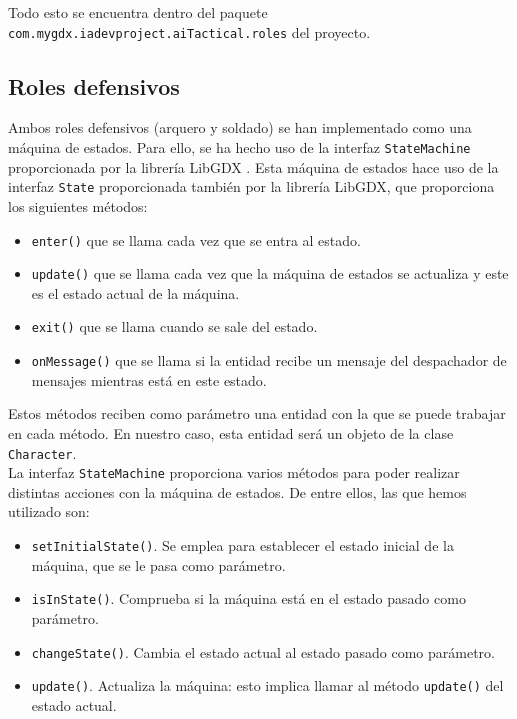 Todo esto se encuentra dentro del paquete \texttt{com.mygdx.iadevproject.aiTactical.roles} del proyecto.


\medskip
\subsection{Roles defensivos}
Ambos roles defensivos (arquero y soldado) se han implementado como una máquina de estados. Para ello, se ha hecho uso de la interfaz \texttt{StateMachine} proporcionada por la librería LibGDX \cite{stateMachine}. Esta máquina de estados hace uso de la interfaz \texttt{State} proporcionada también por la librería LibGDX, que proporciona los siguientes métodos:
\begin{itemize}
  \item \texttt{enter()} que se llama cada vez que se entra al estado. 
  \item \texttt{update()} que se llama cada vez que la máquina de estados se actualiza y este es el estado actual de la máquina.
  \item \texttt{exit()} que se llama cuando se sale del estado.
  \item \texttt{onMessage()} que se llama si la entidad recibe un mensaje del despachador de mensajes mientras está en este estado. 
\end{itemize}

Estos métodos reciben como parámetro una entidad con la que se puede trabajar en cada método. En nuestro caso, esta entidad será un objeto de la clase \texttt{Character}. \\

La interfaz \texttt{StateMachine} proporciona varios métodos para poder realizar distintas acciones con la máquina de estados. De entre ellos, las que hemos utilizado son:
\begin{itemize}
 \item \texttt{setInitialState()}. Se emplea para establecer el estado inicial de la máquina, que se le pasa como parámetro.
 \item \texttt{isInState()}. Comprueba si la máquina está en el estado pasado como parámetro.
 \item \texttt{changeState()}. Cambia el estado actual al estado pasado como parámetro.
 \item \texttt{update()}. Actualiza la máquina: esto implica llamar al método \texttt{update()} del estado actual. 
\end{itemize}

